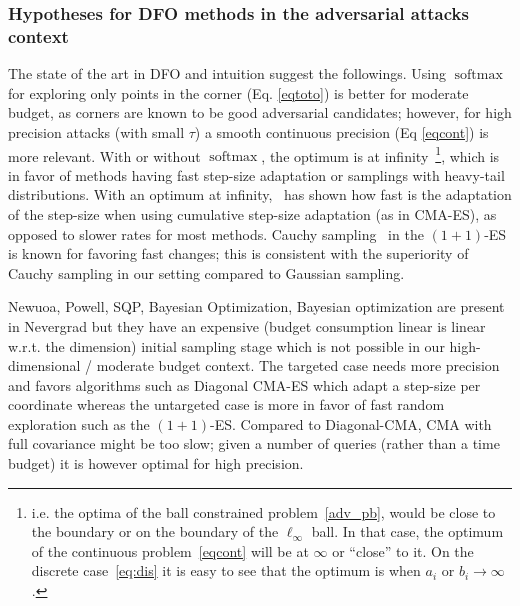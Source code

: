 \subsubsection{Hypotheses for DFO methods in the adversarial attacks context}\label{hypo}
The state of the art in DFO and intuition suggest the followings.
 Using $\operatorname{softmax}$ for exploring only points in the corner (Eq. \ref{eqtoto}) is better for moderate budget, as corners are known to be good adversarial candidates; however, for high precision attacks (with small $\tau$) a smooth continuous precision (Eq \ref{eqcont}) is more relevant.
 With or without $\operatorname{softmax}$, the optimum is at infinity~\footnote{i.e. the optima of the ball constrained problem~\ref{adv_pb}, would be close to the boundary or on the boundary of the $\ell_\infty$ ball.  In that case, the optimum of the continuous problem~\ref{eqcont} will be at $\infty$ or “close” to it. On the discrete case~\ref{eq:dis} it is easy to see that the optimum is when $a_i$ or $b_i \rightarrow \infty$.}, which is in favor of methods having fast step-size adaptation or samplings with heavy-tail distributions. With an optimum at infinity,~\citep{csalinear} has shown how fast is the adaptation of the step-size when using cumulative step-size adaptation (as in CMA-ES), as opposed to slower rates for most methods. Cauchy sampling~\citep{cauchy} in the $(1+1)$-ES is known for favoring fast changes; this is consistent with the superiority of Cauchy sampling in our setting compared to Gaussian sampling. 

Newuoa, Powell, SQP, Bayesian Optimization, Bayesian optimization are present in Nevergrad but they have an expensive (budget consumption linear is linear w.r.t. the dimension) initial sampling stage which is not possible in our high-dimensional / moderate budget context. 
 The targeted case needs more precision and favors algorithms such as Diagonal CMA-ES which adapt a step-size per coordinate whereas the untargeted case is more in favor of fast random exploration such as the $(1+1)$-ES.
 Compared to Diagonal-CMA, CMA with full covariance might be too slow; given a number of queries (rather than a time budget) it is however optimal for high precision.


